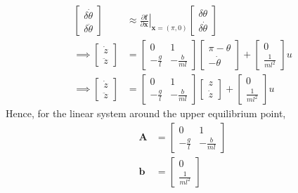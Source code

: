 \begin{align*}
	\begin{bmatrix}
		\delta \dot{\theta}\\
		\delta\ddot{\theta}
	\end{bmatrix} &\approx \left.\frac{\partial \bm{f}}{\partial \bm{x}}\right\vert_{\bm{x} = \left(\pi,0\right)}\begin{bmatrix}
	\delta \theta\\
	\delta\dot{\theta}
\end{bmatrix}\\
\implies\begin{bmatrix}
	\dot{z}\\
	\ddot{z}
\end{bmatrix} &= \begin{bmatrix}
0 & 1 \\
-\frac{g}{l} & -\frac{b}{ml}
\end{bmatrix}\begin{bmatrix}
\pi - \theta\\
-\dot{\theta}
\end{bmatrix} + \begin{bmatrix}
0\\
\frac{1}{ml^2}
\end{bmatrix}u\\
\implies \begin{bmatrix}
	\dot{z}\\
	\ddot{z}
\end{bmatrix} &= \begin{bmatrix}
	0 & 1 \\
	-\frac{g}{l} & -\frac{b}{ml}
\end{bmatrix}\begin{bmatrix}
z\\
\dot{z}
\end{bmatrix} + \begin{bmatrix}
	0\\
	\frac{1}{ml^2}
\end{bmatrix}u
\end{align*}
Hence, for the linear system around the upper equilibrium point, 
\begin{align*}
	\bm{A} &= \begin{bmatrix}
		0 & 1 \\
		-\frac{g}{l} & -\frac{b}{ml}
	\end{bmatrix}\\
\bm{b} &= \begin{bmatrix}
	0\\
	\frac{1}{ml^2}
\end{bmatrix}
\end{align*}

